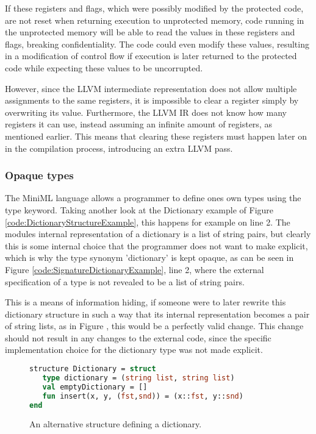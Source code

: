 \documentclass[10pt,a4paper]{report}
\begin{document}
If these registers and flags, which were possibly modified by the protected code, are not reset when returning execution to unprotected memory, code running in the unprotected memory will be able to read the values in these registers and flags, breaking confidentiality. The code could even modify these values, resulting in a modification of control flow if execution is later returned to the protected code while expecting these values to be uncorrupted.

However, since the LLVM intermediate representation does not allow multiple assignments to the same registers, it is impossible to clear a register simply by overwriting its value.
Furthermore, the LLVM IR does not know how many registers it can use, instead assuming an infinite amount of registers, as mentioned earlier. This means that clearing these registers must happen later on in the compilation process, introducing an extra LLVM pass.

\subsubsection{Opaque types}

The \mbox{MiniML} language allows a programmer to define ones own types using the type keyword. Taking another look at the Dictionary example of Figure \ref{code:DictionaryStructureExample}, this happens for example on line 2. The modules internal representation of a dictionary is a list of string pairs, but clearly this is some internal choice that the programmer does not want to make explicit, which is why the type synonym 'dictionary' is kept opaque, as can be seen in Figure \ref{code:SignatureDictionaryExample}, line 2, where the external specification of a type is not revealed to be a list of string pairs.

This is a means of information hiding, if someone were to later rewrite this dictionary structure in such a way that its internal representation becomes a pair of string lists, as in Figure , this would be a perfectly valid change. This change should not result in any changes to the external code, since the specific implementation choice for the dictionary type was not made explicit.

\begin{figure}[!htb]
\begin{lstlisting}[frame=single, language=ML]
structure Dictionary = struct
   type dictionary = (string list, string list)
   val emptyDictionary = []
   fun insert(x, y, (fst,snd)) = (x::fst, y::snd)
end
\end{lstlisting}
\label{code:DictionaryStructureExample2}
\caption{An alternative structure defining a dictionary.}
\end{figure}
\end{document}
